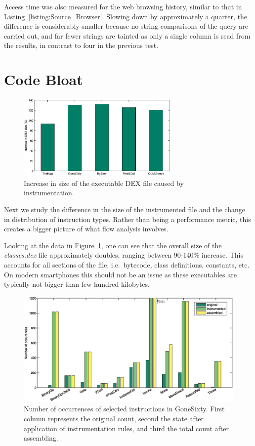 \documentclass[12pt,twoside,notitlepage]{report}
\begin{document}
Access time was also measured for the web browsing history, similar to that in Listing~\ref{listing:Source_Browser}. Slowing down by approximately a quarter, the difference is considerably smaller because no string comparisons of the query are carried out, and far fewer strings are tainted as only a single column is read from the results, in contrast to four in the previous test.

\section{Code Bloat}

\begin{figure}
	\centerline{
		\includegraphics[width=0.7\textwidth]{figs/fig_eval_filesize.eps}
	}
	\caption{Increase in size of the executable DEX file caused by instrumentation.}
	\label{figure:Evalutaion_FileSize}
\end{figure}

Next we study the difference in the size of the instrumented file and the change in distribution of instruction types. Rather than being a performance metric, this creates a bigger picture of what flow analysis involves.

Looking at the data in Figure~\ref{figure:Evalutaion_FileSize}, one can see that the overall size of the \emph{classes.dex} file approximately doubles, ranging between 90-140\% increase. This accounts for all sections of the file, i.e.\ bytecode, class definitions, constants, etc. On modern smartphones this should not be an issue as these executables are typically not bigger than few hundred kilobytes.

\begin{figure}
	\centerline{	
		\includegraphics[width=\textwidth]{figs/fig_eval_codebloat.eps}
	}
	\caption{Number of occurrences of selected instructions in GoneSixty. First column represents the original count, second the state after application of instrumentation rules, and third the total count after assembling.}
	\label{figure:Evalutaion_CodeBloat}
\end{figure}
\end{document}
